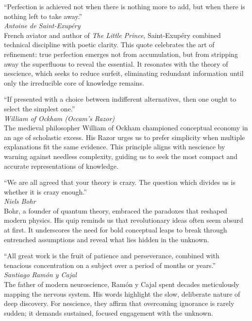 \vspace{1em}

\noindent
\textquotedblleft Perfection is achieved not when there is nothing more to add, but when there is nothing left to take away.\textquotedblright \\
\emph{Antoine de Saint-Exupéry} \\
French aviator and author of \emph{The Little Prince}, Saint-Exupéry combined technical discipline with poetic clarity. This quote celebrates the art of refinement: true perfection emerges not from accumulation, but from stripping away the superfluous to reveal the essential. It resonates with the theory of nescience, which seeks to reduce surfeit, eliminating redundant information until only the irreducible core of knowledge remains.

\vspace{1em}

\noindent
\textquotedblleft If presented with a choice between indifferent alternatives, then one ought to select the simplest one.\textquotedblright \\
\emph{William of Ockham (Occam's Razor)} \\
The medieval philosopher William of Ockham championed conceptual economy in an age of scholastic excess. His Razor urges us to prefer simplicity when multiple explanations fit the same evidence. This principle aligns with nescience by warning against needless complexity, guiding us to seek the most compact and accurate representations of knowledge.

\vspace{1em}

\noindent
\textquotedblleft We are all agreed that your theory is crazy. The question which divides us is whether it is crazy enough.\textquotedblright \\
\emph{Niels Bohr} \\
Bohr, a founder of quantum theory, embraced the paradoxes that reshaped modern physics. His quip reminds us that revolutionary ideas often seem absurd at first. It underscores the need for bold conceptual leaps to break through entrenched assumptions and reveal what lies hidden in the unknown.

\vspace{1em}

\noindent
\textquotedblleft All great work is the fruit of patience and perseverance, combined with tenacious concentration on a subject over a period of months or years.\textquotedblright \\
\emph{Santiago Ramón y Cajal} \\
The father of modern neuroscience, Ramón y Cajal spent decades meticulously mapping the nervous system. His words highlight the slow, deliberate nature of deep discovery. For nescience, they affirm that overcoming ignorance is rarely sudden; it demands sustained, focused engagement with the unknown.

